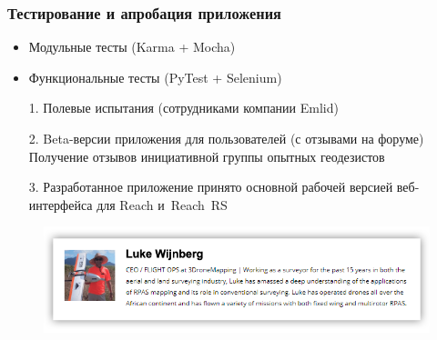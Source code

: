 \documentclass[xetex,с,aspectratio=169]{beamer}
\begin{document}
%
%
\begin{frame}
  \frametitle{Тестирование и апробация приложения}
  
  \large
  
  \begin{itemize}
    \setlength\itemsep{0.5em}
    \item Модульные тесты (Karma + Mocha)
    \item Функциональные тесты (PyTest + Selenium)
  \end{itemize}
  \begin{center}
    \vskip -0.5cm
    \color{ifmoblue}{\rule{.5\textwidth}{0.5pt}}
  \end{center}
  \vskip -0.25cm
  \begin{itemize}
    \setlength\itemsep{0.5em}
    \item[1.] Полевые испытания (сотрудниками компании Emlid)
    \item[2.] Beta-версии приложения для пользователей (с отзывами на форуме)\\
              Получение отзывов инициативной группы опытных геодезистов
    \item[3.] Разработанное приложение принято основной рабочей версией веб-интерфейса для Reach и~Reach~RS
  \end{itemize}
  \vskip -0.2cm
  \begin{figure}[b]
    \centering
    \includegraphics[width=.5\paperwidth]{../img/presentation/luke_wijnberg}\\[-0.75em]
    {
      \scriptsize
    }
  \end{figure}
\end{frame}
\end{document}

